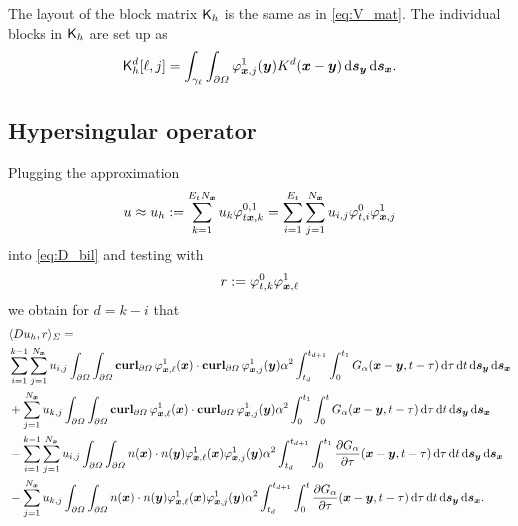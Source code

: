 \documentclass[a4paper,11pt]{article}
\begin{document}
The layout of the block matrix ${{\mathsf{K}}}_h$ is the same as in \eqref{eq:V_mat}. The individual blocks in ${{\mathsf{K}}}_h$ are set up as
\begin{equation*}
  {\ensuremath{{\mathsf{K}}}}^d_h[ \ell , j ] = \int_{\gamma_\ell} \int_{\partial\Omega} \varphi^1_{{{\bm{x}}},j}({{\bm{y}}}) K^d({{\bm{x}}}-{{\bm{y}}}) \,{\mathrm{d}}{{\bm{s}}}_{{\bm{y}}} \,{\mathrm{d}}{{\bm{s}}}_{{\bm{x}}}.
\end{equation*}

\subsection{Hypersingular operator}

Plugging the approximation
\begin{equation*}
 u \approx u_h := \sum_{k=1}^{E_t N_{{\bm{x}}}} u_k \varphi^{0,1}_{t{{\bm{x}}},k} = \sum_{i=1}^{E_t} \sum_{j=1}^{N_{{\bm{x}}}} u_{i,j} \varphi^0_{t,i} \varphi^1_{{{\bm{x}}},j}
\end{equation*}
into \eqref{eq:D_bil} and testing with
\begin{equation*}
  r := \varphi^0_{t,k} \varphi^1_{{{\bm{x}}},\ell}
\end{equation*}
we obtain for $d=k-i$ that
\begin{align*}
  &\langle Du_h, r \rangle_\Sigma = \\ 
  &\sum_{i=1}^{k-1} \sum_{j=1}^{N_{{\bm{x}}}} u_{i,j}\int_{\partial\Omega} \int_{\partial\Omega} \operatorname{\mathbf{curl}}_{\partial\Omega} \varphi^1_{{{\bm{x}}},\ell}({{\bm{x}}}) \cdot \operatorname{\mathbf{curl}}_{\partial\Omega} \varphi^1_{{{\bm{x}}},j}({{\bm{y}}}) \alpha^2 \int_{t_{d}}^{t_{d+1}} \int_{0}^{t_1} G_\alpha({{\bm{x}}}-{{\bm{y}}},t-\tau) \,{\mathrm{d}}\tau \,{\mathrm{d}} t \,{\mathrm{d}}{{\bm{s}}}_{{\bm{y}}} \,{\mathrm{d}}{{\bm{s}}}_{{\bm{x}}} \\
    &+\sum_{j=1}^{N_{{\bm{x}}}} u_{k,j}\int_{\partial\Omega} \int_{\partial\Omega} \operatorname{\mathbf{curl}}_{\partial\Omega} \varphi^1_{{{\bm{x}}},\ell}({{\bm{x}}}) \cdot \operatorname{\mathbf{curl}}_{\partial\Omega} \varphi^1_{{{\bm{x}}},j}({{\bm{y}}}) \alpha^2 \int_{0}^{t_1} \int_{0}^{t} G_\alpha({{\bm{x}}}-{{\bm{y}}},t-\tau) \,{\mathrm{d}}\tau \,{\mathrm{d}} t \,{\mathrm{d}}{{\bm{s}}}_{{\bm{y}}} \,{\mathrm{d}}{{\bm{s}}}_{{\bm{x}}} \\
  &- \sum_{i=1}^{k-1} \sum_{j=1}^{N_{{\bm{x}}}} u_{i,j} \int_{\partial\Omega} \int_{\partial\Omega} n({{\bm{x}}}) \cdot n({{\bm{y}}}) \varphi^1_{{{\bm{x}}},\ell}({{\bm{x}}}) \varphi^1_{{{\bm{x}}},j}({{\bm{y}}}) \alpha^2 \int_{t_d}^{t_{d+1}} \int_0^{t_1} \frac{\partial G_\alpha}{\partial \tau}({{\bm{x}}}-{{\bm{y}}},t-\tau) \,{\mathrm{d}}\tau \,{\mathrm{d}} t \,{\mathrm{d}}{{\bm{s}}}_{{\bm{y}}} \,{\mathrm{d}}{{\bm{s}}}_{{\bm{x}}} \\
    &- \sum_{j=1}^{N_{{\bm{x}}}} u_{k,j} \int_{\partial\Omega} \int_{\partial\Omega} n({{\bm{x}}}) \cdot n({{\bm{y}}}) \varphi^1_{{{\bm{x}}},\ell}({{\bm{x}}}) \varphi^1_{{{\bm{x}}},j}({{\bm{y}}}) \alpha^2 \int_{t_d}^{t_{d+1}} \int_0^{t} \frac{\partial G_\alpha}{\partial \tau}({{\bm{x}}}-{{\bm{y}}},t-\tau) \,{\mathrm{d}}\tau \,{\mathrm{d}} t \,{\mathrm{d}}{{\bm{s}}}_{{\bm{y}}} \,{\mathrm{d}}{{\bm{s}}}_{{\bm{x}}}.
\end{align*}
\end{document}
